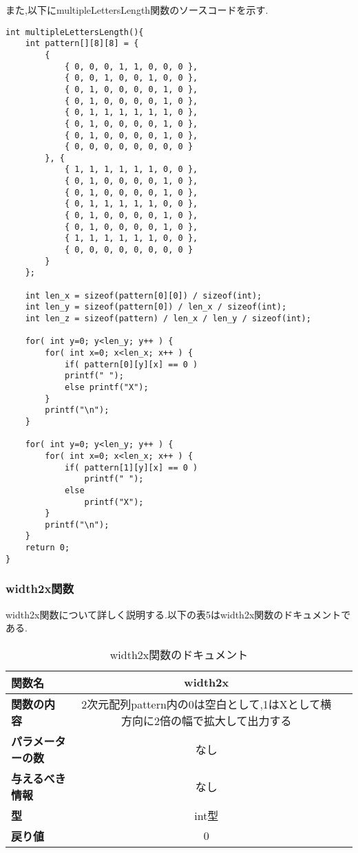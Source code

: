 \documentclass[uplatex,dvipdfmx]{jsarticle}
\begin{document}
また,以下にmultipleLettersLength関数のソースコードを示す.
\begin{lstlisting}[firstnumber = 1, caption=複数の文字を縦に並べる, label=code]   
int multipleLettersLength(){
    int pattern[][8][8] = {
        {
            { 0, 0, 0, 1, 1, 0, 0, 0 },
            { 0, 0, 1, 0, 0, 1, 0, 0 },
            { 0, 1, 0, 0, 0, 0, 1, 0 },
            { 0, 1, 0, 0, 0, 0, 1, 0 },
            { 0, 1, 1, 1, 1, 1, 1, 0 },
            { 0, 1, 0, 0, 0, 0, 1, 0 },
            { 0, 1, 0, 0, 0, 0, 1, 0 },
            { 0, 0, 0, 0, 0, 0, 0, 0 }
        }, {
            { 1, 1, 1, 1, 1, 1, 0, 0 },
            { 0, 1, 0, 0, 0, 0, 1, 0 },
            { 0, 1, 0, 0, 0, 0, 1, 0 },
            { 0, 1, 1, 1, 1, 1, 0, 0 },
            { 0, 1, 0, 0, 0, 0, 1, 0 },
            { 0, 1, 0, 0, 0, 0, 1, 0 },
            { 1, 1, 1, 1, 1, 1, 0, 0 },
            { 0, 0, 0, 0, 0, 0, 0, 0 }
        }
    };

    int len_x = sizeof(pattern[0][0]) / sizeof(int);
    int len_y = sizeof(pattern[0]) / len_x / sizeof(int);
    int len_z = sizeof(pattern) / len_x / len_y / sizeof(int);

    for( int y=0; y<len_y; y++ ) {
        for( int x=0; x<len_x; x++ ) {
            if( pattern[0][y][x] == 0 ) 
            printf(" ");
            else printf("X");
        }
        printf("\n");
    }

    for( int y=0; y<len_y; y++ ) {
        for( int x=0; x<len_x; x++ ) {
            if( pattern[1][y][x] == 0 ) 
                printf(" ");
            else
                printf("X");
        }
        printf("\n");
    }
    return 0;
}
\end{lstlisting}

\subsubsection{width2x関数}
width2x関数について詳しく説明する.以下の表5はwidth2x関数のドキュメントである.
\newpage
\begin{table}[h]
    \centering
    \caption{width2x関数のドキュメント}
    \begin{tabular}{@{}lcc@{}}
    \toprule
    \textbf{関数名}         & \textbf{width2x}                                        \\ \midrule
    \textbf{関数の内容}                & 2次元配列pattern内の0は空白として,1はXとして横方向に2倍の幅で拡大して出力する\\ 
    \textbf{パラメーターの数}               &     なし                                \\ 
    \textbf{与えるべき情報}             &     なし                        \\ 
    \textbf{型}                &     int型                    \\ 
    \textbf{戻り値}                & 0                              \\ \bottomrule
  \end{tabular}
\end{table}
\end{document}
